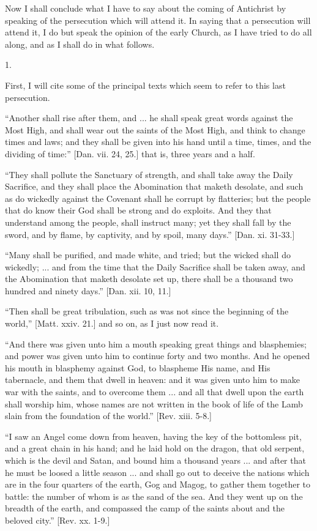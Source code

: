 Now I shall conclude what I have to say about the coming of
Antichrist by speaking of the persecution which will attend it. In
saying that a persecution will attend it, I do but speak the opinion
of the early Church, as I have tried to do all along, and as I shall
do in what follows.

1.

First, I will cite some of the principal texts which seem to refer
to this last persecution.

``Another shall rise after them, and ... he shall speak great
words against the Most High, and shall wear out the saints of the Most
High, and think to change times and laws; and they shall be given into
his hand until a time, times, and the dividing of time:'' [Dan.
vii. 24, 25.] that is, three years and a half.

``They shall pollute the Sanctuary of strength, and shall take
away the Daily Sacrifice, and they shall place the Abomination that
maketh desolate, and such as do wickedly against the Covenant shall he
corrupt by flatteries; but the people that do know their God shall be
strong and do exploits. And they that understand among the people,
shall instruct many; yet they shall fall by the sword, and by flame,
by captivity, and by spoil, many days.'' [Dan. xi. 31-33.]

``Many shall be purified, and made white, and tried; but the
wicked shall do wickedly; ... and from the time that the Daily
Sacrifice shall be taken away, and the Abomination that maketh
desolate set up, there shall be a thousand two hundred and ninety
days.'' [Dan. xii. 10, 11.]

``Then shall be great tribulation, such as was not since the
beginning of the world,'' [Matt. xxiv. 21.] and so on, as I just
now read it.

``And there was given unto him a mouth speaking great things
and blasphemies; and power was given unto him to continue forty and
two months. And he opened his mouth in blasphemy against God, to
blaspheme His name, and His tabernacle, and them that dwell in heaven:
and it was given unto him to make war with the saints, and to overcome
them ... and all that dwell upon the earth shall worship him, whose
names are not written in the book of life of the Lamb slain from
the foundation of the world.'' [Rev. xiii. 5-8.]

``I saw an Angel come down from heaven, having the key of the
bottomless pit, and a great chain in his hand; and he laid hold on the
dragon, that old serpent, which is the devil and Satan, and bound him
a thousand years ... and after that he must be loosed a little season
... and shall go out to deceive the nations which are in the four
quarters of the earth, Gog and Magog, to gather them together to
battle: the number of whom is as the sand of the sea. And they went up
on the breadth of the earth, and compassed the camp of the saints
about and the beloved city.'' [Rev. xx. 1-9.]

